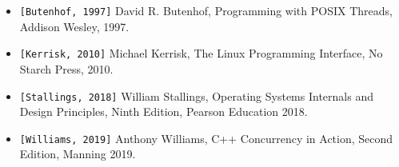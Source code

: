 
\begin{itemize}
\item
\verb|[Butenhof, 1997]| David R. Butenhof, Programming with POSIX Threads, Addison Wesley, 1997.

\item
\verb|[Kerrisk, 2010]| Michael Kerrisk, The Linux Programming Interface, No Starch Press, 2010.

\item
\verb|[Stallings, 2018]| William Stallings, Operating Systems Internals and Design Principles, Ninth Edition, Pearson Education 2018.

\item
\verb|[Williams, 2019]| Anthony Williams, C++ Concurrency in Action, Second Edition, Manning 2019.
\end{itemize}